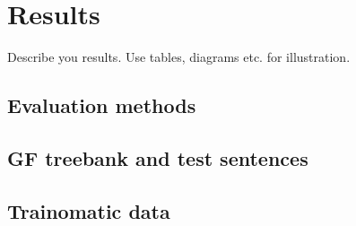 \chapter{Results}
Describe you results. Use tables, diagrams etc. for illustration.
\section{Evaluation methods}
\section{GF treebank and test sentences}
\section{Trainomatic data}